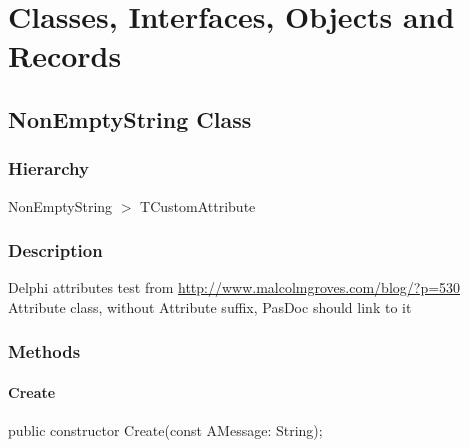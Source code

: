 \documentclass{report}
\newif\ifpdf
\begin{document}
\section{Classes, Interfaces, Objects and Records}
\ifpdf
\subsection*{\large{\textbf{NonEmptyString Class}}\normalsize\hspace{1ex}\hrulefill}
\else
\subsection*{NonEmptyString Class}
\fi
\label{ok_attributes.NonEmptyString}
\subsubsection*{\large{\textbf{Hierarchy}}\normalsize\hspace{1ex}\hfill}
NonEmptyString {$>$} TCustomAttribute
\subsubsection*{\large{\textbf{Description}}\normalsize\hspace{1ex}\hfill}
Delphi attributes test from \href{http://www.malcolmgroves.com/blog/?p=530}{http://www.malcolmgroves.com/blog/?p=530} Attribute class, without Attribute suffix, PasDoc should link to it\subsubsection*{\large{\textbf{Methods}}\normalsize\hspace{1ex}\hfill}
\paragraph*{Create}\hspace*{\fill}

\label{ok_attributes.NonEmptyString-Create}
\begin{list}{}{
\setlength{\itemindent}{0cm}
\setlength{\listparindent}{0cm}
\setlength{\leftmargin}{\evensidemargin}
\addtolength{\leftmargin}{\tmplength}
\settowidth{\labelsep}{X}
\addtolength{\leftmargin}{\labelsep}
\setlength{\labelwidth}{\tmplength}
}
\item[\textbf{Declaration}\hfill]
\ifpdf
\begin{flushleft}
\fi
\begin{ttfamily}
public constructor Create(const AMessage: String);\end{ttfamily}

\ifpdf
\end{flushleft}
\fi

\end{list}
\ifpdf
\end{document}
